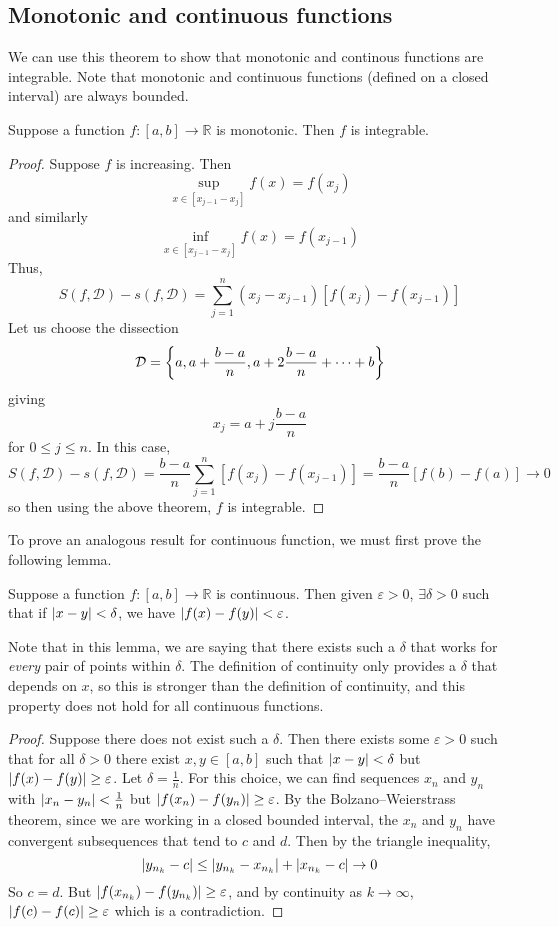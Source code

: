 \subsection{Monotonic and continuous functions}
We can use this theorem to show that monotonic and continous functions are integrable.
Note that monotonic and continuous functions (defined on a closed interval) are always bounded.
\begin{theorem}
	Suppose a function \(f \colon [a, b] \to \mathbb R\) is monotonic.
	Then \(f\) is integrable.
\end{theorem}
\begin{proof}
	Suppose \(f\) is increasing.
	Then
	\[\sup_{x \in [x_{j-1} - x_j]} f(x) = f(x_j)\]
	and similarly
	\[\inf_{x \in [x_{j-1} - x_j]} f(x) = f(x_{j-1})\]
	Thus,
	\[
		S(f, \mathcal D) - s(f, \mathcal D) = \sum_{j=1}^n (x_j - x_{j-1}) \left[ f(x_j) - f(x_{j-1}) \right]
	\]
	Let us choose the dissection
	\[
		\mathcal D = \qty{ a, a + \frac{b-a}{n}, a + 2\frac{b-a}{n} + \dots + b }
	\]
	giving
	\[
		x_j = a + j\frac{b-a}{n}
	\]
	for \(0 \leq j \leq n\).
	In this case,
	\[
		S(f, \mathcal D) - s(f, \mathcal D) = \frac{b-a}{n} \sum_{j=1}^n \left[ f(x_j) - f(x_{j-1}) \right] = \frac{b-a}{n} \left[ f(b) - f(a) \right] \to 0
	\]
	so then using the above theorem, \(f\) is integrable.
\end{proof}
To prove an analogous result for continuous function, we must first prove the following lemma.
\begin{lemma}
	Suppose a function \(f \colon [a, b] \to \mathbb R\) is continuous.
	Then given \(\varepsilon > 0\), \(\exists \delta > 0\) such that if \(\abs{x-y} < \delta\), we have \(\abs{f(x) - f(y)} < \varepsilon\).
\end{lemma}
Note that in this lemma, we are saying that there exists such a \(\delta\) that works for \textit{every} pair of points within \(\delta\).
The definition of continuity only provides a \(\delta\) that depends on \(x\), so this is stronger than the definition of continuity, and this property does not hold for all continuous functions.
\begin{proof}
	Suppose there does not exist such a \(\delta\).
	Then there exists some \(\varepsilon > 0\) such that for all \(\delta > 0\) there exist \(x, y \in [a, b]\) such that \(\abs{x-y} < \delta\) but \(\abs{f(x) - f(y)} \geq \varepsilon\).
	Let \(\delta = \frac{1}{n}\).
	For this choice, we can find sequences \(x_n\) and \(y_n\) with \(\abs{x_n - y_n} < \frac{1}{n}\) but \(\abs{f(x_n) - f(y_n)} \geq \varepsilon\).
	By the Bolzano--Weierstrass theorem, since we are working in a closed bounded interval, the \(x_n\) and \(y_n\) have convergent subsequences that tend to \(c\) and \(d\).
	Then by the triangle inequality,
	\[
		\abs{y_{n_k} - c} \leq \abs{y_{n_k} - x_{n_k}} + \abs{x_{n_k} - c} \to 0
	\]
	So \(c = d\).
	But \(\abs{f(x_{n_k}) - f(y_{n_k})} \geq \varepsilon\), and by continuity as \(k \to \infty\), \(\abs{f(c) - f(c)} \geq \varepsilon\) which is a contradiction.
\end{proof}
